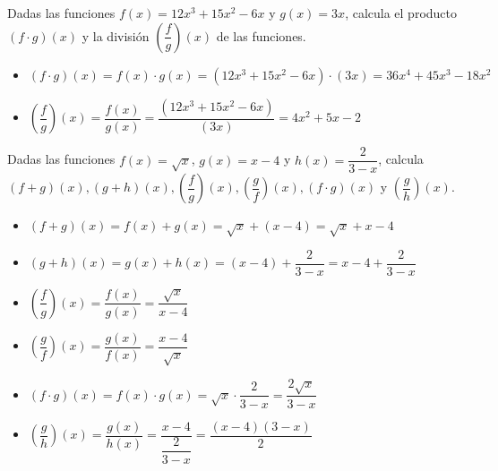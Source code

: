 \begin{ex}
	Dadas las funciones $f(x)=12x^3+15x^2-6x$ y $g(x)=3x$, calcula el producto $(f \cdot g)(x)$ y la división $(\dfrac{f}{g})(x)$ de las funciones.
	\begin{sol}
		\begin{itemize}
			\item $(f \cdot g)(x) = f(x) \cdot g(x) = (12x^3+15x^2-6x) \cdot(3x) = 36x^4+45x^3-18x^2$
			\item $(\dfrac{f}{g})(x) = \dfrac{f(x)}{g(x)} = \dfrac{(12x^3+15x^2-6x)}{(3x)} = 4x^2+5x-2$
		\end{itemize}
	\end{sol}
\end{ex}

\vspace{1cm}

\begin{ex}
	Dadas las funciones $f(x)=\sqrt{x}$, $g(x)=x-4$ y $h(x)=\dfrac{2}{3-x}$, calcula $(f+g)(x), (g+h)(x), (\dfrac{f}{g})(x), (\dfrac{g}{f})(x), (f\cdot g)(x)$ y $(\dfrac{g}{h})(x)$.
	\begin{sol}
		\begin{itemize}
			\item $(f+g)(x) = f(x) + g(x) = \sqrt{x} + (x-4) = \sqrt{x} + x -4$
			\item $(g+h)(x) = g(x) + h(x) = (x-4) + \dfrac{2}{3-x} = x - 4 + \dfrac{2}{3-x}$
			\item $(\dfrac{f}{g})(x) = \dfrac{f(x)}{g(x)} = \dfrac{\sqrt{x}}{x-4}$
			\item $(\dfrac{g}{f})(x) = \dfrac{g(x)}{f(x)} = \dfrac{x-4}{\sqrt{x}}$
			\item $(f\cdot g)(x) = f(x) \cdot g(x) = \sqrt{x} \cdot \dfrac{2}{3-x} = \dfrac{2\sqrt{x}}{3-x}$
			\item $(\dfrac{g}{h})(x) = \dfrac{g(x)}{h(x)} = \dfrac{x-4}{\dfrac{2}{3-x}} = \dfrac{(x-4)(3-x)}{2}$
		\end{itemize}
	\end{sol}
\end{ex}

